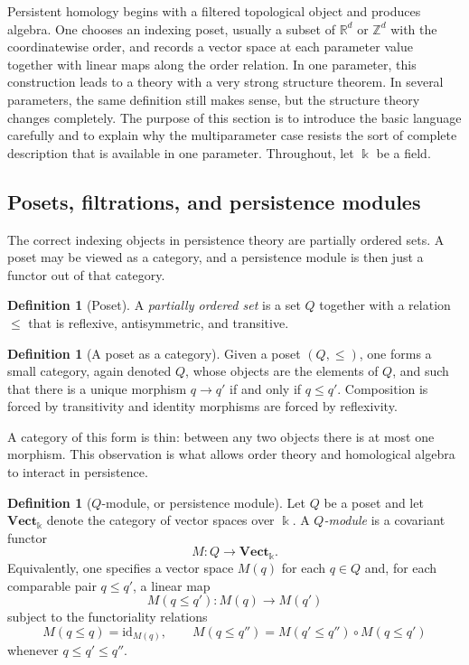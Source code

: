 \documentclass[11pt]{article}
\newcommand{\R}{\mathbb{R}}
\newcommand{\Z}{\mathbb{Z}}
\newcommand{\kk}{\Bbbk}
\theoremstyle{definition}
\newtheorem{defn}[theorem]{Definition}
\theoremstyle{remark}
\begin{document}
Persistent homology begins with a filtered topological object and produces algebra. One chooses an indexing poset, usually a subset of $\R^d$ or $\Z^d$ with the coordinatewise order, and records a vector space at each parameter value together with linear maps along the order relation. In one parameter, this construction leads to a theory with a very strong structure theorem. In several parameters, the same definition still makes sense, but the structure theory changes completely. The purpose of this section is to introduce the basic language carefully and to explain why the multiparameter case resists the sort of complete description that is available in one parameter. Throughout, let $\kk$ be a field.

\subsection{Posets, filtrations, and persistence modules}

The correct indexing objects in persistence theory are partially ordered sets. A poset may be viewed as a category, and a persistence module is then just a functor out of that category.

\begin{defn}[Poset]
A \emph{partially ordered set} is a set $Q$ together with a relation $\leq$ that is reflexive, antisymmetric, and transitive.
\end{defn}

\begin{defn}[A poset as a category]
Given a poset $(Q,\leq)$, one forms a small category, again denoted $Q$, whose objects are the elements of $Q$, and such that there is a unique morphism $q \to q'$ if and only if $q \leq q'$. Composition is forced by transitivity and identity morphisms are forced by reflexivity.
\end{defn}

A category of this form is thin: between any two objects there is at most one morphism. This observation is what allows order theory and homological algebra to interact in persistence.

\begin{defn}[$Q$-module, or persistence module]
Let $Q$ be a poset and let $\mathbf{Vect}_{\kk}$ denote the category of vector spaces over $\kk$. A \emph{$Q$-module} is a covariant functor
\[
M : Q \longrightarrow \mathbf{Vect}_{\kk}.
\]
Equivalently, one specifies a vector space $M(q)$ for each $q \in Q$ and, for each comparable pair $q \leq q'$, a linear map
\[
M(q \leq q') : M(q) \to M(q')
\]
subject to the functoriality relations
\[
M(q \leq q)=\mathrm{id}_{M(q)}, \qquad
M(q \leq q'') = M(q' \leq q'') \circ M(q \leq q')
\]
whenever $q \leq q' \leq q''$.
\end{defn}
\end{document}
